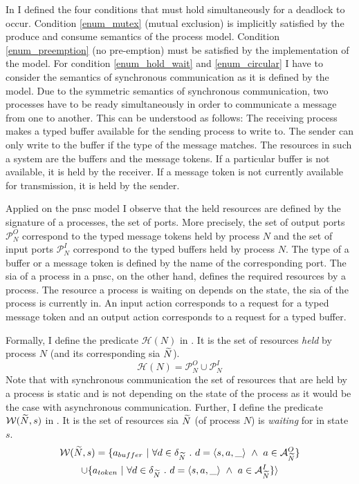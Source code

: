 In \Def{\ref{def_dl}} I defined the four conditions that must hold simultaneously for a deadlock to occur.
Condition \ref{enum_mutex} (mutual exclusion) is implicitly satisfied by the produce and consume semantics of the process model.
Condition \ref{enum_preemption} (no pre-emption) must be satisfied by the implementation of the model.
For condition \ref{enum_hold_wait} and \ref{enum_circular} I have to consider the semantics of synchronous communication as it is defined by the model.
Due to the symmetric semantics of synchronous communication, two processes have to be ready simultaneously in order to communicate a message from one to another.
This can be understood as follows:
The receiving process makes a typed buffer available for the sending process to write to.
The sender can only write to the buffer if the type of the message matches.
The resources in such a system are the buffers and the message tokens.
If a particular buffer is not available, it is held by the receiver.
If a message token is not currently available for transmission, it is held by the sender.

Applied on the \gls{pnsc} model I observe that the held resources are defined by the signature of a processes, \ie the set of ports.
More precisely, the set of output ports $\mathcal{P}_N^O$ correspond to the typed message tokens held by process $N$ and the set of input ports $\mathcal{P}_N^I$ correspond to the typed buffers held by process $N$.
The type of a buffer or a message token is defined by the name of the corresponding port.
The \gls{sia} of a process in a \gls{pnsc}, on the other hand, defines the required resources by a process.
The resource a process is waiting on depends on the state, the \gls{sia} of the process is currently in.
An input action corresponds to a request for a typed message token and an output action corresponds to a request for a typed buffer.

Formally, I define the predicate $\mathcal{H}(N)$ in \Equ{\ref{eq_hold}}.
It is the set of resources \emph{held} by process $N$ (and its corresponding \gls{sia} $\widetilde{N}$).
\begin{equation}
    \label{eq_hold}
    \mathcal{H}(N) = \mathcal{P}_N^O \cup \mathcal{P}_N^I
\end{equation}
Note that with synchronous communication the set of resources that are held by a process is static and is not depending on the state of the process as it would be the case with asynchronous communication.
Further, I define the predicate $\mathcal{W}(\widetilde{N}, s)$ in \Equ{\ref{eq_wait}}.
It is the set of resources \gls{sia} $\widetilde{N}$ (of process $N$) is \emph{waiting} for in state $s$.
\begin{multline}
    \label{eq_wait}
    \mathcal{W}(\widetilde{N}, s) = \{ a_{buffer} \ | \ \forall d \in \delta_{\widetilde{N}} \ . \ d = \langle s, a, \_ \rangle \ \land \ a \in \mathcal{A}_{\widetilde{N}}^O \} \\
    \cup \{ a_{token} \ | \ \forall d \in \delta_{\widetilde{N}} \ . \ d = \langle s, a, \_ \rangle \ \land \ a \in \mathcal{A}_{\widetilde{N}}^I \} \rangle
\end{multline}

